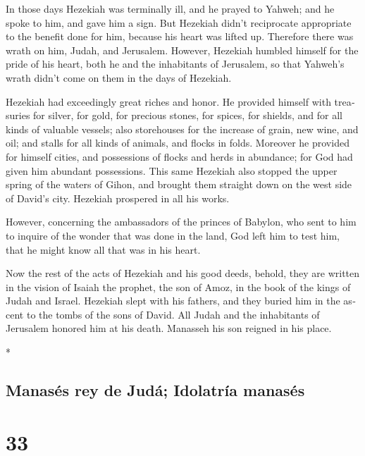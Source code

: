 \begin{paracol}{2}
\begin{otherlanguage}{english}
 In those days Hezekiah was terminally ill, and he prayed
to Yahweh; and he spoke to him, and gave him a sign.  But
Hezekiah didn't reciprocate appropriate to the benefit done for him,
because his heart was lifted up. Therefore there was wrath on him,
Judah, and Jerusalem.  However, Hezekiah humbled himself
for the pride of his heart, both he and the inhabitants of Jerusalem, so
that Yahweh's wrath didn't come on them in the days of Hezekiah.

 Hezekiah had exceedingly great riches and honor. He
provided himself with treasuries for silver, for gold, for precious
stones, for spices, for shields, and for all kinds of valuable vessels;
 also storehouses for the increase of grain, new wine,
and oil; and stalls for all kinds of animals, and flocks in folds.
 Moreover he provided for himself cities, and possessions
of flocks and herds in abundance; for God had given him abundant
possessions.  This same Hezekiah also stopped the upper
spring of the waters of Gihon, and brought them straight down on the
west side of David's city. Hezekiah prospered in all his works.

 However, concerning the ambassadors of the princes of
Babylon, who sent to him to inquire of the wonder that was done in the
land, God left him to test him, that he might know all that was in his
heart.

 Now the rest of the acts of Hezekiah and his good deeds,
behold, they are written in the vision of Isaiah the prophet, the son of
Amoz, in the book of the kings of Judah and Israel. 
Hezekiah slept with his fathers, and they buried him in the ascent to
the tombs of the sons of David. All Judah and the inhabitants of
Jerusalem honored him at his death. Manasseh his son reigned in his
place.

\end{otherlanguage}

\switchcolumn[0]*

\hypertarget{manasuxe9s-rey-de-juduxe1-idolatruxeda-manasuxe9s}{%
\subsection{Manasés rey de Judá; Idolatría
manasés}\label{manasuxe9s-rey-de-juduxe1-idolatruxeda-manasuxe9s}}

\hypertarget{section-64}{%
\section{33}\label{section-64}}


\end{paracol}
